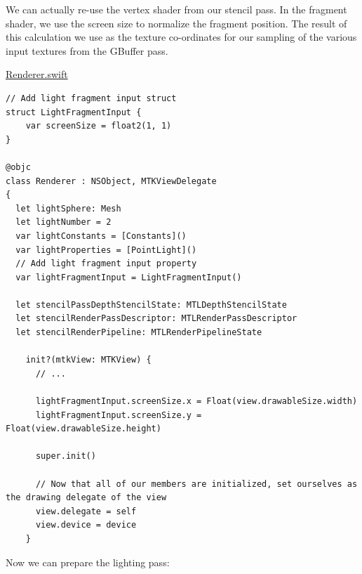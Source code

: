 \documentclass[11pt]{article}
\begin{document}
We can actually re-use the vertex shader from our stencil pass. In the fragment
shader, we use the screen size to normalize the fragment position. The result of
this calculation we use as the texture co-ordinates for our sampling of the
various input textures from the GBuffer pass.

\uline{Renderer.swift}
\begin{verbatim}
// Add light fragment input struct
struct LightFragmentInput {
    var screenSize = float2(1, 1)
}

@objc
class Renderer : NSObject, MTKViewDelegate
{
  let lightSphere: Mesh
  let lightNumber = 2
  var lightConstants = [Constants]()
  var lightProperties = [PointLight]()
  // Add light fragment input property
  var lightFragmentInput = LightFragmentInput()

  let stencilPassDepthStencilState: MTLDepthStencilState
  let stencilRenderPassDescriptor: MTLRenderPassDescriptor
  let stencilRenderPipeline: MTLRenderPipelineState

    init?(mtkView: MTKView) {
      // ...

      lightFragmentInput.screenSize.x = Float(view.drawableSize.width)
      lightFragmentInput.screenSize.y = Float(view.drawableSize.height)

      super.init()

      // Now that all of our members are initialized, set ourselves as the drawing delegate of the view
      view.delegate = self
      view.device = device
    }
\end{verbatim}

Now we can prepare the lighting pass:
\end{document}
